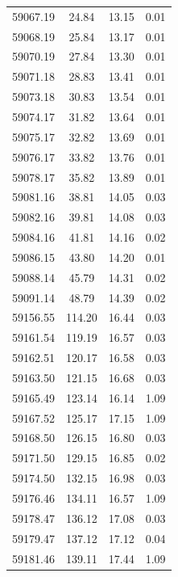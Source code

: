 \begin{longtable}{|c|c|c|c|}
 59067.19 &   24.84 &       13.15 &          0.01 \\
 59068.19 &   25.84 &       13.17 &          0.01 \\
 59070.19 &   27.84 &       13.30 &          0.01 \\
 59071.18 &   28.83 &       13.41 &          0.01 \\
 59073.18 &   30.83 &       13.54 &          0.01 \\
 59074.17 &   31.82 &       13.64 &          0.01 \\
 59075.17 &   32.82 &       13.69 &          0.01 \\
 59076.17 &   33.82 &       13.76 &          0.01 \\
 59078.17 &   35.82 &       13.89 &          0.01 \\
 59081.16 &   38.81 &       14.05 &          0.03 \\
 59082.16 &   39.81 &       14.08 &          0.03 \\
 59084.16 &   41.81 &       14.16 &          0.02 \\
 59086.15 &   43.80 &       14.20 &          0.01 \\
 59088.14 &   45.79 &       14.31 &          0.02 \\
 59091.14 &   48.79 &       14.39 &          0.02 \\
 59156.55 &  114.20 &       16.44 &          0.03 \\
 59161.54 &  119.19 &       16.57 &          0.03 \\
 59162.51 &  120.17 &       16.58 &          0.03 \\
 59163.50 &  121.15 &       16.68 &          0.03 \\
 59165.49 &  123.14 &       16.14 &          1.09 \\
 59167.52 &  125.17 &       17.15 &          1.09 \\
 59168.50 &  126.15 &       16.80 &          0.03 \\
 59171.50 &  129.15 &       16.85 &          0.02 \\
 59174.50 &  132.15 &       16.98 &          0.03 \\
 59176.46 &  134.11 &       16.57 &          1.09 \\
 59178.47 &  136.12 &       17.08 &          0.03 \\
 59179.47 &  137.12 &       17.12 &          0.04 \\
 59181.46 &  139.11 &       17.44 &          1.09 \\

\end{longtable}

